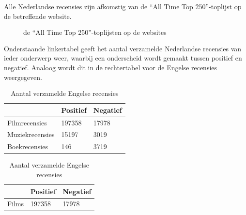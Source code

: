Alle Nederlandse recensies zijn afkomstig van de ``All Time Top 250''-toplijst op de betreffende website.

\begin{figure}%
    \centering
    \caption{de ``All Time Top 250''-toplijsten op de websites}%
\end{figure}

Onderstaande linkertabel geeft het aantal verzamelde Nederlandse recensies van ieder onderwerp weer, waarbij een onderscheid wordt gemaakt tussen positief en negatief. Analoog wordt dit in de rechtertabel voor de Engelse recensies weergegeven.\\

\begin{table}[h]
\centering
\setlength\tabcolsep{2pt}
\begin{minipage}[t]{0.48\textwidth}
\centering
\begin{tabular}{l|l|l|}
\cline{2-3}
                                      & Positief & Negatief \\ \hline
\multicolumn{1}{|l|}{Filmrecensies}   & 197358   & 17978    \\ \hline
\multicolumn{1}{|l|}{Muziekrecensies} & 15197    & 3019     \\ \hline
\multicolumn{1}{|l|}{Boekrecensies}   & 146      & 3719     \\ \hline
\end{tabular}
\caption{Aantal verzamelde Nederlandse recensies} 
\label{tabel: aantal verzamelde Nederlandse recensies}
\end{minipage}%
\hfill
\begin{minipage}[t]{0.48\textwidth}
\centering
\begin{tabular}{l|l|l|}
\cline{2-3}
                            & Positief & Negatief \\ \hline
\multicolumn{1}{|l|}{Films} & 197358   & 17978    \\ \hline
\end{tabular}
\caption{Aantal verzamelde Engelse recensies}
\end{minipage}
\end{table}

